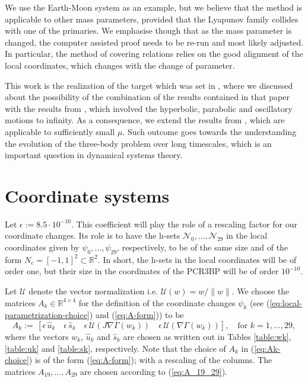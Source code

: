 \documentclass[1p]{article}
\begin{document}
We use the Earth-Moon system as an example, but we believe that the method is applicable to other mass parameters, provided that the Lyapunov family collides with one of the primaries. We emphasise though that as the mass parameter is changed, the computer assisted proof needs to be re-run and most likely adjusted. In particular, the method of covering relations relies on the good alignment of the local coordinates, which changes with the change of parameter.

This work is the realization of the target which was set in \cite{CAPINSKI2026109173}, where we discussed about the possibility of the combination of the results contained in that paper with the results from \cite{MR4391693}, which involved the hyperbolic, parabolic and oscillatory motions to infinity. As a consequence, we extend the results from \cite{MR4890942}, which are applicable to sufficiently small $\mu$. Such outcome goes towards the understanding the evolution of the three-body problem over long timescales, which is an important question in dynamical systems theory.

\appendix

\section{Coordinate systems}
\label{appendix:coordinate_systems}

Let $\epsilon:= 8.5 \cdot 10^{-10}$. This coefficient will play the role of a rescaling factor for our coordinate changes. Its role is to have the h-sets $\mathcal{N}_0,\ldots, \mathcal{N}_{29}$ in the local coordinates given by $\psi_0,\ldots, \psi_{29}$, respectively, to be of the same size and of the form $N_c=[-1,1]^2\subset \mathbb{R}^2$. In short, the h-sets in the local coordinates will be of order one, but their size in the coordinates of the PCR3BP will be of order $10^{-10}$.
 
Let $\mathcal{U}$ denote the vector normalization i.e. $\mathcal{U}(w) = w / \| w \|$.  We choose the matrices $A_k\in\mathbb{R}^{4\times4}$ for the definition of the coordinate changes $\psi_k$ (see (\ref{eq:local-parametrization-choice}) and (\ref{eq:A-form})) to be
\begin{equation}
    A_k:= \, \left[
        \epsilon\,\hat{u}_k \quad
        \epsilon\,\hat{s}_k \quad
        \epsilon\,\mathcal{U} \left( J\nabla \Gamma(w_k) \right) \quad
        \epsilon\,\mathcal{U} \left( \nabla \Gamma(w_k) \right) \right], \quad \mbox{for }k=1,\ldots,29, \label{eq:Ak-choice}
\end{equation}
where the vectors $w_k$, $\hat{u}_k$ and $\hat{s}_k$ are chosen as written out in Tables \ref{table:wk}, \ref{table:uk} and \ref{table:sk}, respectively. Note that the choice of $A_k$ in (\ref{eq:Ak-choice}) is of the form (\ref{eq:A-form}); with a rescaling of the columns. The matrices $A_{19}, ..., A_{29}$ are chosen according to (\ref{eq:A_19_29}).
\end{document}
